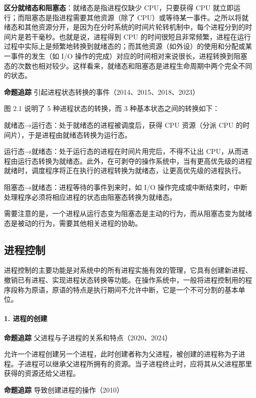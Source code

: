 \documentclass{ctexbook}
\begin{document}
	\textbf{区分就绪态和阻塞态}：就绪态是指进程仅缺少 CPU，只要获得 CPU 就立即运行；而阻塞态是指进程需要其他资源（除了 CPU）或等待某一事件。之所以将就绪态和其他资源分开，是因为在分时系统的时间片轮转机制中，每个进程分到的时间片是若干毫秒。也就是说，进程得到 CPU 的时间很短且非常频繁，进程在运行过程中实际上是频繁地转换到就绪态的；而其他资源（如外设）的使用和分配或某一事件的发生（如 I/O 操作的完成）对应的时间相对来说很长，进程转换到阻塞态的次数也相对较少。这样看来，就绪态和阻塞态是进程生命周期中两个完全不同的状态。
	
	\textbf{命题追踪} 引起进程状态转换的事件（2014、2015、2018、2023）
	
	图 2.1 说明了 5 种进程状态的转换，而 3 种基本状态之间的转换如下：

就绪态→运行态：处于就绪态的进程被调度后，获得 CPU 资源（分派 CPU 的时间片），于是进程由就绪态转换为运行态。

运行态→就绪态：处于运行态的进程在时间片用完后，不得不让出 CPU，从而进程由运行态转换为就绪态。此外，在可剥夺的操作系统中，当有更高优先级的进程就绪时，调度程序将正在执行的进程转换为就绪态，让更高优先级的进程执行。

阻塞态→就绪态：进程等待的事件到来时，如 I/O 操作完成或中断结束时，中断处理程序必须将相应进程的状态由阻塞态转换为就绪态。
	
	需要注意的是，一个进程从运行态变为阻塞态是主动的行为，而从阻塞态变为就绪态是被动的行为，需要其他相关进程的协助。
	
	\subsection{进程控制}
	
	进程控制的主要功能是对系统中的所有进程实施有效的管理，它具有创建新进程、撤销已有进程、实现进程状态转换等功能。在操作系统中，一般将进程控制用的程序段称为原语，原语的特点是执行期间不允许中断，它是一个不可分割的基本单位。
	
	\paragraph{1. 进程的创建}
	
	\textbf{命题追踪} 父进程与子进程的关系和特点（2020、2024）
	
	允许一个进程创建另一个进程，此时创建者称为父进程，被创建的进程称为子进程。子进程可以继承父进程所拥有的资源。当子进程终止时，应将其从父进程那里获得的资源还给父进程。
	
	\textbf{命题追踪} 导致创建进程的操作（2010）
	
\end{document}
